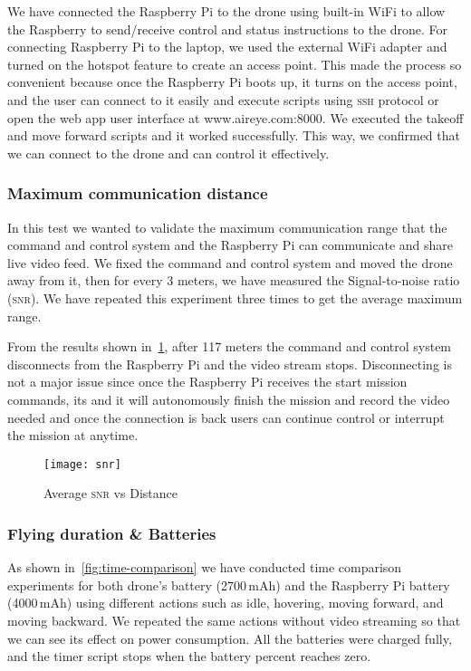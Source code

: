 \documentclass[../main.tex]{subfiles}
\begin{document}
We have connected the
Raspberry Pi to the drone using built-in WiFi
to allow the Raspberry to send/receive control and status 
instructions to the drone. 
For connecting Raspberry Pi to the laptop, 
we used the external WiFi adapter and turned 
on the hotspot feature to create an access point.
This made the process so convenient because 
once the Raspberry Pi boots up, it turns on the 
access point, and the user can connect to it 
easily and execute scripts using \textsc{ssh} 
protocol or open the web app user interface 
at www.aireye.com:8000. We executed the takeoff 
and move forward scripts and it worked successfully.
This way, we confirmed that we can connect to the drone and can control it effectively.

\subsubsection{Maximum communication distance}

In this test we wanted to validate the maximum communication range that
the command and control system and the Raspberry Pi can communicate
and share live video feed. We fixed the command and control system and moved
the drone away from it, then for every 3 meters, we have 
measured the Signal-to-noise ratio (\textsc{snr}).
We have repeated this experiment three times to get the average maximum range.

From the results shown in~\cref{fig:snr-vs-distance}, after 117 meters 
the command and control system disconnects from the Raspberry Pi
and the video stream stops. Disconnecting is not a major issue
since once the Raspberry Pi receives the start mission commands, its 
and it will autonomously finish the mission and record the video needed
and once the connection is back users can continue control or interrupt the mission
at anytime.
 
\begin{figure}[tbp]
	\centering
	\texttt{[image: snr]}
        \caption{Average \textsc{snr} vs Distance}
	\label{fig:snr-vs-distance}
\end{figure}

\subsubsection{Flying duration \& Batteries}

As shown in~\cref{fig:time-comparison} we have 
conducted time comparison experiments for both drone's
battery (2700\,mAh) and the Raspberry Pi battery (4000\,mAh) 
using different actions such as idle, hovering, 
moving forward, and moving backward. We repeated 
the same actions without video streaming so that 
we can see its effect on power consumption. 
All the batteries were charged fully, and the timer 
script stops when the battery percent reaches zero. 
\end{document}

